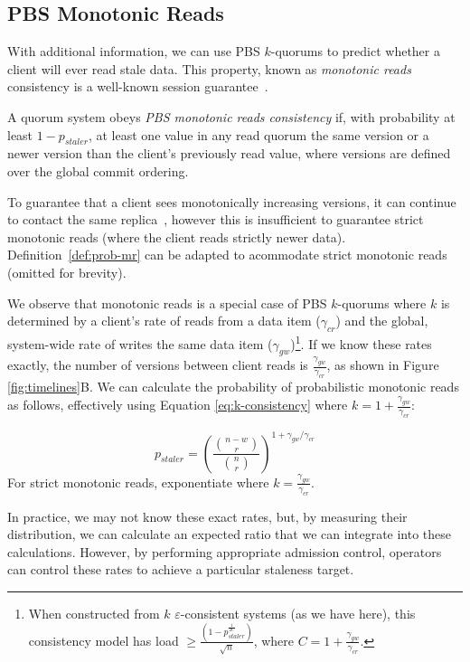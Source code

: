 \documentclass{vldb}
\begin{document}
\subsection{PBS Monotonic Reads}

With additional information, we can use PBS $k$-quorums to
predict whether a client will ever read stale data.  This property,
known as \textit{monotonic reads} consistency is a well-known session
guarantee~\cite{sessionguarantees}.

\begin{definition}
\label{def:prob-mr}
A quorum system obeys \textit{PBS monotonic reads consistency} if, with probability at least $1-p_{staler}$, at
least one value in any read quorum the same version or a newer version
than the client's previously read value, where versions are defined
over the global commit ordering.
\end{definition}

To guarantee that a client sees monotonically increasing versions, it
can continue to contact the same replica~\cite{vogels-defs}, however
this is insufficient to guarantee strict monotonic reads (where the
client reads strictly newer data).  Definition~\ref{def:prob-mr} can
be adapted to acommodate strict monotonic reads (omitted for brevity).

We observe that monotonic reads is a special case of PBS
$k$-quorums where $k$ is determined by a client's rate of reads from a
data item ($\gamma_{cr}$) and the global, system-wide rate of writes
the same data item ($\gamma_{gw}$)\footnote{When constructed from $k$
  $\varepsilon$-consistent systems (as we have here), this consistency
  model has load $\geq
  \frac{(1-p_{staler}^{\frac{1}{2C}})}{\sqrt{n}}$, where
  $C=1+\frac{\gamma_{gw}}{\gamma_{cr}}$.}.  If we know these rates
exactly, the number of versions between client reads is
$\frac{\gamma_{gw}}{\gamma_{cr}}$, as shown in Figure
\ref{fig:timelines}B.  We can calculate the probability of
probabilistic monotonic reads as follows, effectively using Equation
\ref{eq:k-consistency} where $k=1+\frac{\gamma_{gw}}{\gamma_{cr}}$:

\begin{equation}
\label{eq:prob-mr}
p_{staler} = \left(\frac{{n-w \choose r}}{{n \choose r}}\right)^{1+\gamma_{gw}/\gamma_{cr}}
\end{equation}
For strict monotonic reads, exponentiate where $k=\frac{\gamma_{gw}}{\gamma_{cr}}$.

In practice, we may not know these exact rates, but, by measuring
their distribution, we can calculate an expected ratio that we can
integrate into these calculations.  However, by performing appropriate
admission control, operators can control these rates to achieve a
particular staleness target.
\end{document}
